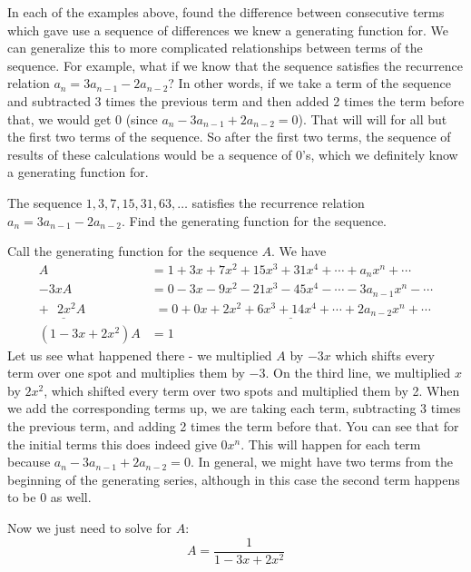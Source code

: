 \documentclass[12pt]{article}
\begin{document}
  
In each of the examples above, found the difference between consecutive terms which gave use a sequence of differences we knew a generating function for.  We can generalize this to more complicated relationships between terms of the sequence.  For example, what if we know that the sequence satisfies the recurrence relation $a_n = 3a_{n-1} - 2a_{n-2}$?  In other words, if we take a term of the sequence and subtracted 3 times the previous term and then added 2 times the term before that, we would get 0 (since $a_n - 3a_{n-1} + 2a_{n-2} = 0$).  That will will for all but the first two terms of the sequence.  So after the first two terms, the sequence of results of these calculations would be a sequence of 0's, which we definitely know a generating function for.

\begin{example}
 The sequence $1, 3, 7, 15, 31, 63, \ldots$ satisfies the recurrence relation $a_n = 3a_{n-1} - 2a_{n-2}$.  Find the generating function for the sequence.
 
 \begin{solution}
  Call the generating function for the sequence $A$.  We have 
  \begin{align*}
   A & = 1 + 3x + 7x^2 + 15x^3 + 31x^4 + \cdots + a_nx^n + \cdots \\
   -3xA & = 0 - 3x - 9x^2 - 21x^3 - 45x^4 - \cdots - 3a_{n-1}x^n - \cdots \\
   \underline{+~~~2x^2A_{~}} & \underline{\,\, = 0 + 0x + 2x^2 + 6x^3 + 14x^4 + \cdots + 2a_{n-2}x^n + \cdots} \\
   (1-3x+2x^2)A & = 1
  \end{align*}
  Let us see what happened there - we multiplied $A$ by $-3x$ which shifts every term over one spot and multiplies them by $-3$.  On the third line, we multiplied $x$ by $2x^2$, which shifted every term over two spots and multiplied them by 2.  When we add the corresponding terms up, we are taking each term, subtracting 3 times the previous term, and adding 2 times the term before that.  You can see that for the initial terms this does indeed give $0x^n$.  This will happen for each term because $a_n - 3a_{n-1} + 2a_{n-2} = 0$.  In general, we might have two terms from the beginning of the generating series, although in this case the second term happens to be 0 as well.
  
  Now we just need to solve for $A$:
  \[A = \frac{1}{1 - 3x + 2x^2}\]
 \end{solution}

\end{example}
\end{document}
